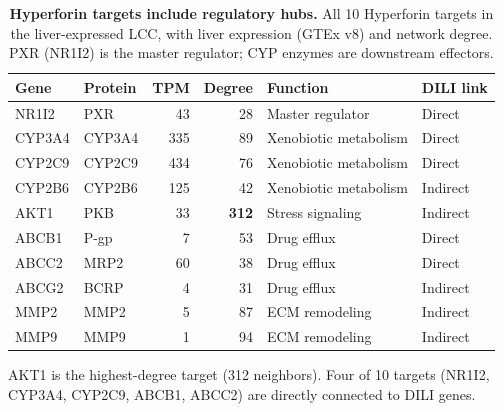 \begin{table}[ht]
\centering
\caption{\textbf{Hyperforin targets include regulatory hubs.}
All 10 Hyperforin targets in the liver-expressed LCC, with liver expression (GTEx v8) and network degree.
PXR (NR1I2) is the master regulator; CYP enzymes are downstream effectors.}
\label{tab:hyperforin_targets}
\vspace{0.5em}
\begin{tabular}{@{}llrrll@{}}
\toprule
\textbf{Gene} & \textbf{Protein} & \textbf{TPM} & \textbf{Degree} & \textbf{Function} & \textbf{DILI link} \\
\midrule
NR1I2 & PXR & 43 & 28 & Master regulator & Direct \\
CYP3A4 & CYP3A4 & 335 & 89 & Xenobiotic metabolism & Direct \\
CYP2C9 & CYP2C9 & 434 & 76 & Xenobiotic metabolism & Direct \\
CYP2B6 & CYP2B6 & 125 & 42 & Xenobiotic metabolism & Indirect \\
AKT1 & PKB & 33 & \textbf{312} & Stress signaling & Indirect \\
ABCB1 & P-gp & 7 & 53 & Drug efflux & Direct \\
ABCC2 & MRP2 & 60 & 38 & Drug efflux & Direct \\
ABCG2 & BCRP & 4 & 31 & Drug efflux & Indirect \\
MMP2 & MMP2 & 5 & 87 & ECM remodeling & Indirect \\
MMP9 & MMP9 & 1 & 94 & ECM remodeling & Indirect \\
\bottomrule
\end{tabular}

\vspace{0.3em}
\begin{minipage}{\linewidth}
\footnotesize
AKT1 is the highest-degree target (312 neighbors). Four of 10 targets (NR1I2, CYP3A4, CYP2C9, ABCB1, ABCC2) are directly connected to DILI genes.
\end{minipage}
\end{table}

